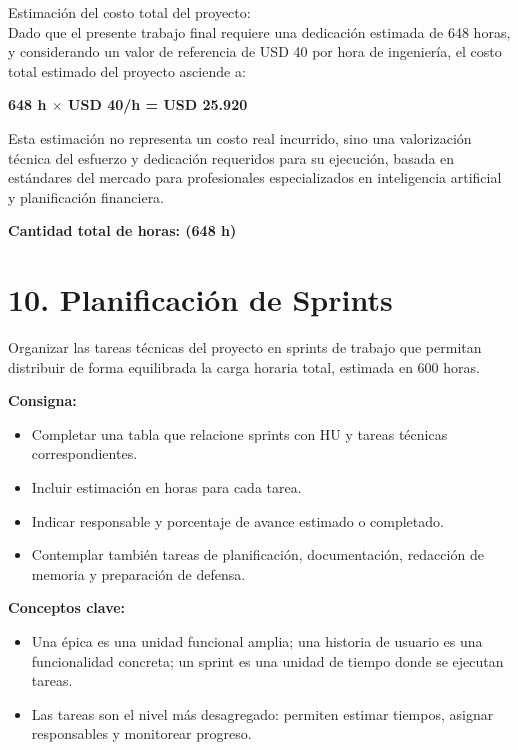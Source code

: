 \documentclass[
11pt, %
]{charter}
\begin{document}
\noindent
Estimación del costo total del proyecto: \\
Dado que el presente trabajo final requiere una dedicación estimada de 648 horas, y considerando un valor de referencia de USD 40 por hora de ingeniería, el costo total estimado del proyecto asciende a:

\begin{center}
\textbf{648 h $\times$ USD 40/h = USD 25.920}
\end{center}

Esta estimación no representa un costo real incurrido, sino una valorización técnica del esfuerzo y dedicación requeridos para su ejecución, basada en estándares del mercado para profesionales especializados en inteligencia artificial y planificación financiera.

\vspace{0.2cm}
\noindent\dotfill

\vspace{0.5cm}
\noindent
\textbf{Cantidad total de horas: (648 h)}

\vspace{0.2cm}
\noindent\dotfill
\pagebreak

\section{10. Planificación de Sprints}

Organizar las tareas técnicas del proyecto en sprints de trabajo que permitan distribuir de forma equilibrada la carga horaria total, estimada en 600 horas.

\textbf{Consigna:}
\begin{itemize}
  \item Completar una tabla que relacione sprints con HU y tareas técnicas correspondientes.
  \item Incluir estimación en horas para cada tarea.
  \item Indicar responsable y porcentaje de avance estimado o completado.
  \item Contemplar también tareas de planificación, documentación, redacción de memoria y preparación de defensa.
\end{itemize}

\textbf{Conceptos clave:}
\begin{itemize}
  \item Una \'{e}pica es una unidad funcional amplia; una historia de usuario es una funcionalidad concreta; un sprint es una unidad de tiempo donde se ejecutan tareas.
  \item Las tareas son el nivel más desagregado: permiten estimar tiempos, asignar responsables y monitorear progreso.
\end{itemize}
\end{document}
